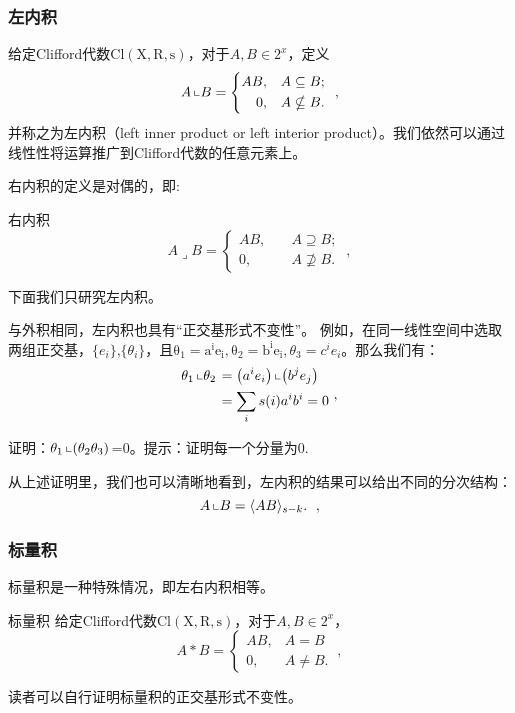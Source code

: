 \subsubsection{左内积}
\begin{definition}{}
给定Clifford代数$\mathrm {Cl(X,R,s)}$，对于$A,B\in 2^x$，定义
\begin{equation}
A\left\llcorner B=\left\{\begin{aligned}
A B,\quad & A \subseteq B ; \\
0,\quad & A \nsubseteq B .
\end{aligned}\right.\right.~,
\end{equation}
并称之为左内积（left inner product or left interior product）。我们依然可以通过线性性将运算推广到Clifford代数的任意元素上。
\end{definition}
右内积的定义是对偶的，即:
\begin{definition}{右内积}
\begin{equation}
A\lrcorner B=\left\{\begin{aligned}
A B,\quad & A \supseteq B ; \\
0,\quad & A \nsupseteq B .
\end{aligned}\right.~,
\end{equation}
\end{definition}
下面我们只研究左内积。

与外积相同，左内积也具有“正交基形式不变性”。
例如，在同一线性空间中选取两组正交基，$\{e_i\}$,$\{\theta _i\}$，且$\mathrm {\theta_1=a^ie_i,\theta_2=b^ie_i},\theta_3=c^ie_i$。那么我们有：
\begin{equation}
\begin{aligned}
\theta_1\left\llcorner\theta_2\right. & =\left(a^i e_i\right)\left\llcorner\left(b^j e_j\right)\right. \\
& =\sum_i s(i) a^i b^i=0
\end{aligned}~,
\end{equation}
\begin{exercise}{}
证明：$\theta_1\left\llcorner(\theta_2\theta_3)\right.$=0。提示：证明每一个分量为0.
\end{exercise}
从上述证明里，我们也可以清晰地看到，左内积的结果可以给出不同的分次结构：
\begin{equation}
A\left\llcorner B=\langle A B\rangle_{s-k} .\right.~,
\end{equation}

\subsubsection{标量积}
标量积是一种特殊情况，即左右内积相等。
\begin{definition}{标量积}
给定Clifford代数$\mathrm {Cl(X,R,s)}$，对于$A,B\in 2^x$，
\begin{equation}
A * B=\left\{\begin{array}{cc}
A B, & A=B \\
0, & A \neq B .
\end{array}\right.~,
\end{equation}
\end{definition}
读者可以自行证明标量积的正交基形式不变性。

